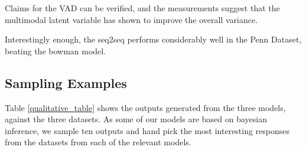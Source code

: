 \documentclass[12pt,twoside]{report}
\begin{document}
Claims for the VAD can be verified, and the measurements suggest that the multimodal latent variable has shown to improve the overall variance. 

Interestingly enough, the seq2seq performs considerably well in the Penn Dataset, beating the bowman model. 

\subsection{Sampling Examples}
\label{sampling_examples}
Table \ref{qualitative_table} shows the outputs generated from the three models, against the three datasets. As some of our models are based on bayesian inference, we sample ten outputs and hand pick the most interesting responses from the datasets from each of the relevant models. 
\end{document}
